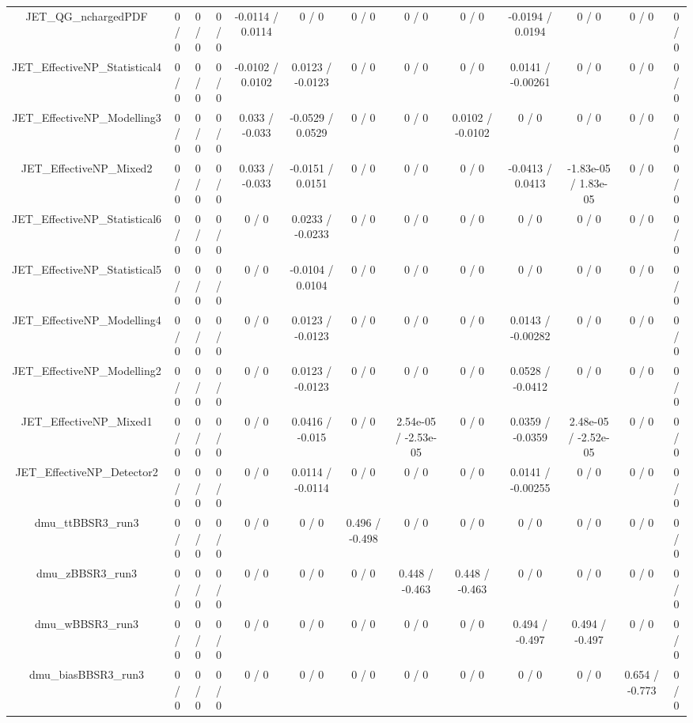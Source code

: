\documentclass[10pt]{article}
\begin{document}
\begin{table}[htbp]
\begin{center}
\begin{tabular}{|c|c|c|c|c|c|c|c|c|c|c|c|c|}
  JET_QG_nchargedPDF & 0 / 0 & 0 / 0 & 0 / 0 & -0.0114 / 0.0114 & 0 / 0 & 0 / 0 & 0 / 0 & 0 / 0 & -0.0194 / 0.0194 & 0 / 0 & 0 / 0 & 0 / 0 \\ 
  JET_EffectiveNP_Statistical4 & 0 / 0 & 0 / 0 & 0 / 0 & -0.0102 / 0.0102 & 0.0123 / -0.0123 & 0 / 0 & 0 / 0 & 0 / 0 & 0.0141 / -0.00261 & 0 / 0 & 0 / 0 & 0 / 0 \\ 
  JET_EffectiveNP_Modelling3 & 0 / 0 & 0 / 0 & 0 / 0 & 0.033 / -0.033 & -0.0529 / 0.0529 & 0 / 0 & 0 / 0 & 0.0102 / -0.0102 & 0 / 0 & 0 / 0 & 0 / 0 & 0 / 0 \\ 
  JET_EffectiveNP_Mixed2 & 0 / 0 & 0 / 0 & 0 / 0 & 0.033 / -0.033 & -0.0151 / 0.0151 & 0 / 0 & 0 / 0 & 0 / 0 & -0.0413 / 0.0413 & -1.83e-05 / 1.83e-05 & 0 / 0 & 0 / 0 \\ 
  JET_EffectiveNP_Statistical6 & 0 / 0 & 0 / 0 & 0 / 0 & 0 / 0 & 0.0233 / -0.0233 & 0 / 0 & 0 / 0 & 0 / 0 & 0 / 0 & 0 / 0 & 0 / 0 & 0 / 0 \\ 
  JET_EffectiveNP_Statistical5 & 0 / 0 & 0 / 0 & 0 / 0 & 0 / 0 & -0.0104 / 0.0104 & 0 / 0 & 0 / 0 & 0 / 0 & 0 / 0 & 0 / 0 & 0 / 0 & 0 / 0 \\ 
  JET_EffectiveNP_Modelling4 & 0 / 0 & 0 / 0 & 0 / 0 & 0 / 0 & 0.0123 / -0.0123 & 0 / 0 & 0 / 0 & 0 / 0 & 0.0143 / -0.00282 & 0 / 0 & 0 / 0 & 0 / 0 \\ 
  JET_EffectiveNP_Modelling2 & 0 / 0 & 0 / 0 & 0 / 0 & 0 / 0 & 0.0123 / -0.0123 & 0 / 0 & 0 / 0 & 0 / 0 & 0.0528 / -0.0412 & 0 / 0 & 0 / 0 & 0 / 0 \\ 
  JET_EffectiveNP_Mixed1 & 0 / 0 & 0 / 0 & 0 / 0 & 0 / 0 & 0.0416 / -0.015 & 0 / 0 & 2.54e-05 / -2.53e-05 & 0 / 0 & 0.0359 / -0.0359 & 2.48e-05 / -2.52e-05 & 0 / 0 & 0 / 0 \\ 
  JET_EffectiveNP_Detector2 & 0 / 0 & 0 / 0 & 0 / 0 & 0 / 0 & 0.0114 / -0.0114 & 0 / 0 & 0 / 0 & 0 / 0 & 0.0141 / -0.00255 & 0 / 0 & 0 / 0 & 0 / 0 \\ 
  dmu_ttBBSR3_run3 & 0 / 0 & 0 / 0 & 0 / 0 & 0 / 0 & 0 / 0 & 0.496 / -0.498 & 0 / 0 & 0 / 0 & 0 / 0 & 0 / 0 & 0 / 0 & 0 / 0 \\ 
  dmu_zBBSR3_run3 & 0 / 0 & 0 / 0 & 0 / 0 & 0 / 0 & 0 / 0 & 0 / 0 & 0.448 / -0.463 & 0.448 / -0.463 & 0 / 0 & 0 / 0 & 0 / 0 & 0 / 0 \\ 
  dmu_wBBSR3_run3 & 0 / 0 & 0 / 0 & 0 / 0 & 0 / 0 & 0 / 0 & 0 / 0 & 0 / 0 & 0 / 0 & 0.494 / -0.497 & 0.494 / -0.497 & 0 / 0 & 0 / 0 \\ 
  dmu_biasBBSR3_run3 & 0 / 0 & 0 / 0 & 0 / 0 & 0 / 0 & 0 / 0 & 0 / 0 & 0 / 0 & 0 / 0 & 0 / 0 & 0 / 0 & 0.654 / -0.773 & 0 / 0 \\ 

\end{tabular}
\end{center}
\end{table}
\end{document}
